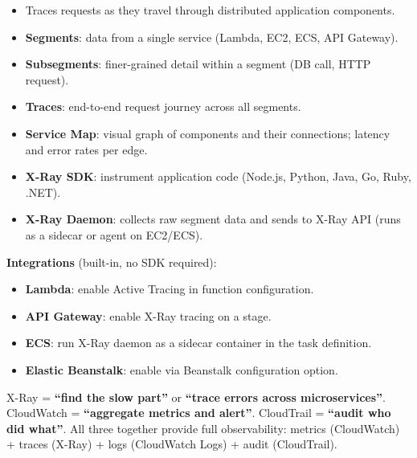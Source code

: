 

\begin{keyfacts}
\begin{itemize}
  \item Traces requests as they travel through distributed application components.
  \item \textbf{Segments}: data from a single service (Lambda, EC2, ECS, API Gateway).
  \item \textbf{Subsegments}: finer-grained detail within a segment (DB call, HTTP request).
  \item \textbf{Traces}: end-to-end request journey across all segments.
  \item \textbf{Service Map}: visual graph of components and their connections; latency and
        error rates per edge.
  \item \textbf{X-Ray SDK}: instrument application code (Node.js, Python, Java, Go, Ruby, .NET).
  \item \textbf{X-Ray Daemon}: collects raw segment data and sends to X-Ray API (runs as a
        sidecar or agent on EC2/ECS).
\end{itemize}
\end{keyfacts}

\textbf{Integrations} (built-in, no SDK required):
\begin{itemize}
  \item \textbf{Lambda}: enable Active Tracing in function configuration.
  \item \textbf{API Gateway}: enable X-Ray tracing on a stage.
  \item \textbf{ECS}: run X-Ray daemon as a sidecar container in the task definition.
  \item \textbf{Elastic Beanstalk}: enable via Beanstalk configuration option.
\end{itemize}

\begin{examtip}
X-Ray = \textbf{``find the slow part''} or \textbf{``trace errors across microservices''}.
CloudWatch = \textbf{``aggregate metrics and alert''}.
CloudTrail = \textbf{``audit who did what''}.
All three together provide full observability: metrics (CloudWatch) + traces (X-Ray) + logs (CloudWatch Logs) + audit (CloudTrail).
\end{examtip}

